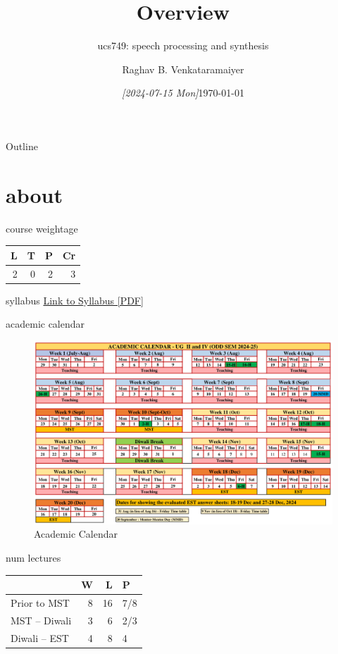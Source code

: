 \documentclass[aspectratio=169,xcolor={dvipsnames,svgnames}]{beamer}
\date{\textit{[2024-07-15 Mon]}}
\title{Overview}
\subtitle{ucs749: speech processing and synthesis}
\author{%
\normalsize Raghav B. Venkataramaiyer
}
\institute{%
CSED TIET Patiala India.
}
\date{\scriptsize \today}
\begin{document}
\maketitle
\begin{frame}{Outline}
\tableofcontents
\end{frame}


\section{about}
\label{sec:org080330f}
\begin{frame}[label={sec:org1cf6eb7}]{course weightage}
\begin{center}
\begin{tabular}{rrrr}
L & T & P & Cr\\[0pt]
\hline
2 & 0 & 2 & 3\\[0pt]
\end{tabular}
\end{center}
\end{frame}

\begin{frame}[label={sec:orge77f31b}]{syllabus}
\href{ucs749-syllabus.pdf}{Link to Syllabus [PDF]​}
\end{frame}

\begin{frame}[label={sec:org0ce9054}]{academic calendar}
\begin{figure}[htbp]
\centering
\includegraphics[width=.9\linewidth]{image/2024-07-15_22-56-44_screenshot.png}
\caption{Academic Calendar}
\end{figure}
\end{frame}

\begin{frame}[label={sec:orgd8325f1}]{num lectures}
\begin{center}
\begin{tabular}{lrrl}
 & W & L & P\\[0pt]
\hline
Prior to MST & 8 & 16 & 7/8\\[0pt]
MST -- Diwali & 3 & 6 & 2/3\\[0pt]
Diwali -- EST & 4 & 8 & 4\\[0pt]
\end{tabular}
\end{center}
\end{frame}
\end{document}
